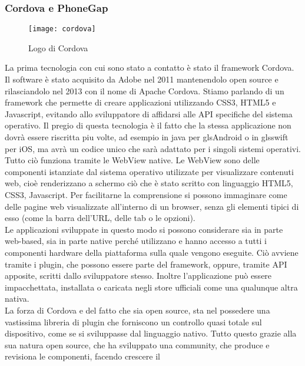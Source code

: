 \subsubsection{Cordova e PhoneGap}

\begin{figure}[h]
	\begin{center}
		\texttt{[image: cordova]}
		\caption{Logo di Cordova}
	\end{center}
\end{figure}

La prima tecnologia con cui sono stato a contatto è stato il framework Cordova. Il software è stato acquisito da Adobe nel
2011 mantenendolo \gls{open source} e rilasciandolo nel 2013 con il nome di Apache Cordova. Stiamo parlando di un framework
che permette di creare applicazioni utilizzando CSS3, HTML5 e Javascript, evitando allo sviluppatore di affidarsi alle API
specifiche del sistema operativo. Il pregio di questa tecnologia è il fatto che la stessa applicazione non dovrà essere
riscritta piu volte, ad esempio in \gls{java} per gls{Android} o in gls{swift} per \gls{iOS}, ma avrà un codice unico che
sarà adattato per i singoli sistemi operativi. \\
Tutto ciò funziona tramite le WebView native. Le WebView sono delle componenti istanziate dal sistema operativo
utilizzate per visualizzare contenuti web, cioè renderizzano a schermo ciò che è stato scritto con linguaggio HTML5,
CSS3, Javascript. Per facilitarne la comprensione si possono immaginare come delle pagine web visualizzate all'interno
di un browser, senza gli elementi tipici di esso (come la barra dell'URL, delle tab o le opzioni). \\
Le applicazioni sviluppate in questo modo si possono considerare sia in parte \gls{web-based}, sia in parte native
perché utilizzano e hanno accesso a tutti i componenti hardware della piattaforma sulla quale vengono eseguite. Ciò
avviene tramite i plugin, che possono essere parte del framework, oppure, tramite API apposite, scritti dallo
sviluppatore stesso. Inoltre l'applicazione può essere impacchettata, installata o caricata negli store ufficiali come
una qualunque altra nativa. \\
La forza di Cordova e del fatto che sia open source, sta nel possedere una vastissima libreria di plugin che forniscono
un controllo quasi totale sul dispositivo, come se si sviluppasse dal linguaggio nativo. Tutto questo grazie alla sua
natura \gls{open source}, che ha sviluppato una community, che produce e revisiona le componenti, facendo crescere il
